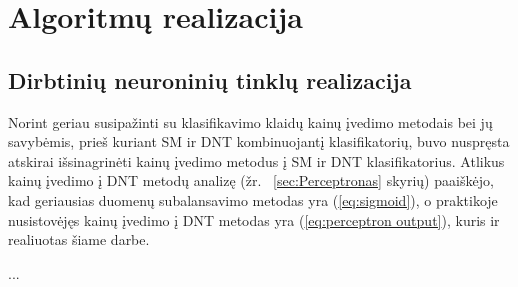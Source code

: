 \section{Algoritmų realizacija}
\subsection{Dirbtinių neuroninių tinklų realizacija}
\label{sec:Dirbtinių neuroninių tinklų realizacija}

Norint geriau susipažinti su klasifikavimo klaidų kainų įvedimo metodais bei jų
savybėmis, prieš kuriant SM ir DNT kombinuojantį klasifikatorių, buvo nuspręsta atskirai
išsinagrinėti kainų įvedimo metodus į SM ir DNT klasifikatorius. Atlikus kainų
įvedimo į DNT metodų analizę (žr. ~\ref{sec:Perceptronas} skyrių) paaiškėjo,
kad geriausias duomenų subalansavimo metodas yra (\ref{eq:sigmoid}), o
praktikoje nusistovėjęs kainų įvedimo į DNT metodas yra (\ref{eq:perceptron output}),
kuris ir realiuotas šiame darbe.

...
